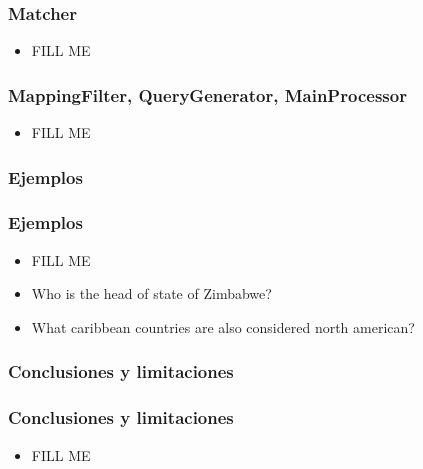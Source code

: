 \begin{frame}
\frametitle{Matcher}
  \begin{itemize}
    \item {\color{red} FILL ME}
  \end{itemize}
\end{frame}

\begin{frame}
\frametitle{MappingFilter, QueryGenerator, MainProcessor}
  \begin{itemize}
    \item {\color{red} FILL ME}
  \end{itemize}
\end{frame}
\subsubsection*{Ejemplos}
\begin{frame}
\frametitle{Ejemplos}
  \begin{itemize}
    \item {\color{red} FILL ME}
    \item Who is the head of state of Zimbabwe?
    \item What caribbean countries are also considered north american?
  \end{itemize}
\end{frame}
\subsubsection*{Conclusiones y limitaciones}
\begin{frame}
\frametitle{Conclusiones y limitaciones}
  \begin{itemize}
    \item {\color{red} FILL ME}
  \end{itemize}
\end{frame}
